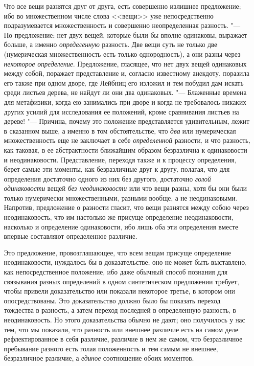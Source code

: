 Что все вещи разнятся друг от друга, есть совершенно излишнее предложение;
ибо во множественном числе слова <<вещи>> уже непосредственно подразумевается
множественность и совершенно неопределенная разность. "--- Но предложение: нет
двух вещей, которые были бы вполне одинаковы, выражает больше, а именно
{\em определенную} разность. Две вещи суть не только
две (нумерическая множественность есть только однородность), а они разны
через {\em некоторое определение}. Предложение,
гласящее, что нет двух вещей одинаковых между собой, поражает представление
и, согласно известному анекдоту, поразила его также при одном дворе, где
Лейбниц его изложил и тем побудил дам искать среди листьев дерева, не
найдут ли они два одинаковых. "--- Блаженные времена для метафизики, когда ею
занимались при дворе и когда не требовалось никаких других усилий для
исследования ее положений, кроме сравнивания листьев на дереве! "--- Причина,
почему это положение представляется удивительным, лежит в сказанном выше, а
именно в том обстоятельстве, что {\em два} или
нумерическая множественность еще не заключает в себе
{\em определенной} разности, и что разность, как
таковая, в ее абстрактности ближайшим образом безразлична к одинаковости и
неодинаковости. Представление, переходя также и к процессу определения,
берет самые эти моменты, как безразличные друг к другу, полагая, что для
определения достаточно одного из них без другого, достаточно
{\em голой одинаковости} вещей
{\em без неодинаковости} или что вещи разны, хотя бы
они были только нумерически множественными, разными вообще, а не
неодинаковыми. Напротив, предложение о разности гласит, что вещи разнятся
между собою через неодинаковость, что им настолько же присуще определение
неодинаковости, насколько и определение одинаковости, ибо лишь оба эти
определения вместе впервые составляют определенное различие.

Это предложение, провозглашающее, что всем вещам присуще определение
неодинаковости, нуждалось бы в доказательстве; оно не может быть
выставлено, как непосредственное положение, ибо даже обычный способ
познания для связывания разных определений в одном синтетическом
предложении требует, чтобы привели доказательство или показали некоторое
третье, в котором они опосредствованы. Это доказательство должно было бы
показать переход тождества в разность, а затем переход последней в
определенную разность, в неодинаковость. Но этого доказательства обычно не
дают; оно получилось у нас тем, что мы показали, что разность или внешнее
различие есть на самом деле рефлектированное в себя различие, различие в
нем же самом, что безразличное пребывание разного есть голая положенность и
тем самым не внешнее, безразличное различие, а
{\em единое} соотношение обоих моментов.

